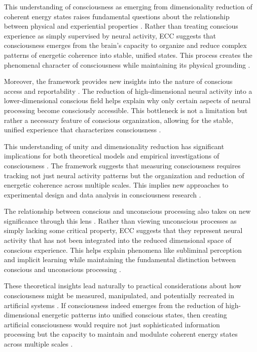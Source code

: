 \begin{refsection}
This understanding of consciousness as emerging from dimensionality reduction of coherent energy states raises fundamental questions about the relationship between physical and experiential properties \cite{tononi2016integrated}. Rather than treating conscious experience as simply supervised by neural activity, ECC suggests that consciousness emerges from the brain's capacity to organize and reduce complex patterns of energetic coherence into stable, unified states. This process creates the phenomenal character of consciousness while maintaining its physical grounding \cite{dehaene2011experimental}.

Moreover, the framework provides new insights into the nature of conscious access and reportability \cite{bayne2003what}. The reduction of high-dimensional neural activity into a lower-dimensional conscious field helps explain why only certain aspects of neural processing become consciously accessible. This bottleneck is not a limitation but rather a necessary feature of conscious organization, allowing for the stable, unified experience that characterizes consciousness \cite{brook2017unity}.

This understanding of unity and dimensionality reduction has significant implications for both theoretical models and empirical investigations of consciousness \cite{tononi2016integrated}. The framework suggests that measuring consciousness requires tracking not just neural activity patterns but the organization and reduction of energetic coherence across multiple scales. This implies new approaches to experimental design and data analysis in consciousness research \cite{dehaene2011experimental}.

The relationship between conscious and unconscious processing also takes on new significance through this lens \cite{baars2002conscious}. Rather than viewing unconscious processes as simply lacking some critical property, ECC suggests that they represent neural activity that has not been integrated into the reduced dimensional space of conscious experience. This helps explain phenomena like subliminal perception and implicit learning while maintaining the fundamental distinction between conscious and unconscious processing \cite{mashour2020conscious}.

These theoretical insights lead naturally to practical considerations about how consciousness might be measured, manipulated, and potentially recreated in artificial systems \cite{koch2017can}. If consciousness indeed emerges from the reduction of high-dimensional energetic patterns into unified conscious states, then creating artificial consciousness would require not just sophisticated information processing but the capacity to maintain and modulate coherent energy states across multiple scales \cite{tani2016exploring}.


\end{refsection}
